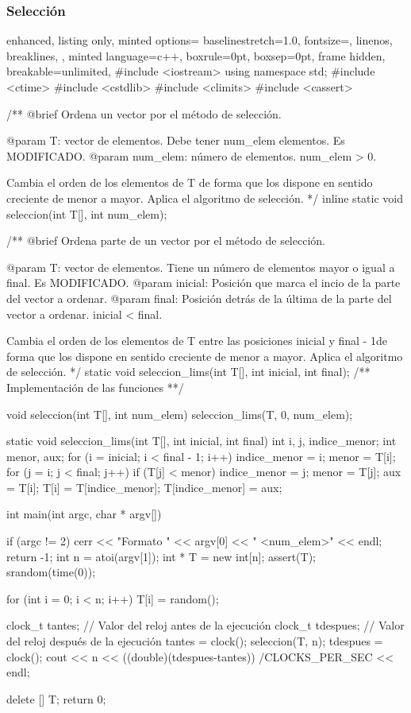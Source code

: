 \documentclass[12pt,spanish]{article}
\begin{document}
\subsubsection{Selección}
\begin{multicols}{2}
\begin{tcblisting}
{
  enhanced,
  listing only,
  minted options={
    baselinestretch=1.0,
    fontsize=\footnotesize,
    linenos,
    breaklines,
  },
  minted language=c++,
  boxrule=0pt,
  boxsep=0pt,
  frame hidden,
  breakable=unlimited,
}
#include <iostream>
using namespace std;
#include <ctime>
#include <cstdlib>
#include <climits>
#include <cassert>

/**
   @brief Ordena un vector por el método de selección.

   @param T: vector de elementos. Debe tener num_elem elementos.
             Es MODIFICADO.
   @param num_elem: número de elementos. num_elem > 0.

   Cambia el orden de los elementos de T de forma que los dispone
   en sentido creciente de menor a mayor. Aplica el algoritmo de selección.
*/
inline static 
void seleccion(int T[], int num_elem);

/**
   @brief Ordena parte de un vector por el método de selección.

   @param T: vector de elementos. Tiene un número de elementos 
                   mayor o igual a final. Es MODIFICADO.
   @param inicial: Posición que marca el incio de la parte del
                   vector a ordenar.
   @param final: Posición detrás de la última de la parte del
                   vector a ordenar. 
		   inicial < final.

   Cambia el orden de los elementos de T entre las posiciones
   inicial y final - 1de forma que los dispone en sentido creciente
   de menor a mayor. Aplica el algoritmo de selección.
*/
static void seleccion_lims(int T[], int inicial, int final);
/**
   Implementación de las funciones
**/

void seleccion(int T[], int num_elem){
  seleccion_lims(T, 0, num_elem);
}

static void seleccion_lims(int T[], int inicial, int final){
  int i, j, indice_menor;
  int menor, aux;
  for (i = inicial; i < final - 1; i++) {
    indice_menor = i;
    menor = T[i];
    for (j = i; j < final; j++)
      if (T[j] < menor) {
	indice_menor = j;
	menor = T[j];
      }
    aux = T[i];
    T[i] = T[indice_menor];
    T[indice_menor] = aux;
  }
}

int main(int argc, char * argv[]){
  if (argc != 2){
      cerr << "Formato " << argv[0] << " <num_elem>" << endl;
      return -1;
   }
  int n = atoi(argv[1]);
  int * T = new int[n];
  assert(T);
  srandom(time(0));

  for (int i = 0; i < n; i++)
      T[i] = random();

  clock_t tantes;    // Valor del reloj antes de la ejecución
  clock_t tdespues;  // Valor del reloj después de la ejecución
  tantes = clock();
  seleccion(T, n);
  tdespues = clock();
  cout << n << ((double)(tdespues-tantes))
  /CLOCKS_PER_SEC << endl;
  
  delete [] T;
  return 0;
}
\end{tcblisting}
\end{multicols}
\newpage
\end{document}
